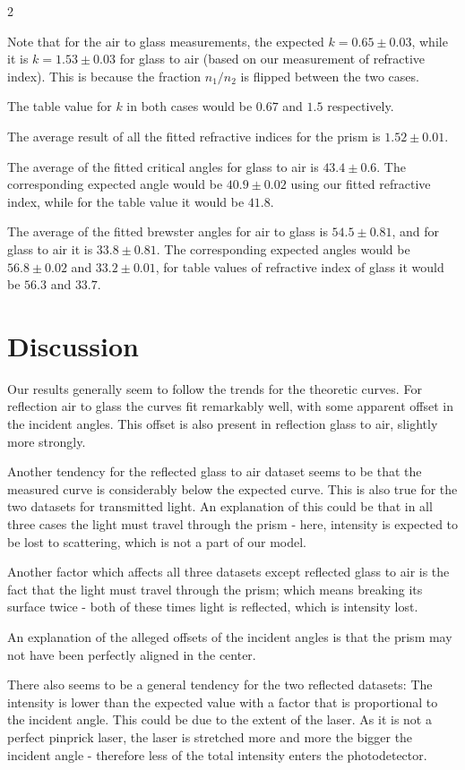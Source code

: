\documentclass[a4paper,oneside,article]{memoir}
\begin{document}
\begin{multicols}{2}

Note that for the air to glass measurements, the expected $k=0.65\pm 0.03$, while it is $k=1.53\pm0.03$ for glass to air (based on our measurement of refractive index). This is because the fraction $n_1/n_2$ is flipped between the two cases.

The table value for $k$ in both cases would be $0.67$ and $1.5$ respectively.

The average result of all the fitted refractive indices for the prism is $1.52\pm0.01$. 

The average of the fitted critical angles for glass to air is $43.4\pm0.6$. The corresponding expected angle would be $40.9\pm0.02$ using our fitted refractive index, while for the table value it would be $41.8$.

The average of the fitted brewster angles for air to glass is $54.5\pm0.81$, and for glass to air it is $33.8\pm0.81$. The corresponding expected angles would be $56.8\pm0.02$ and $33.2\pm0.01$, for table values of refractive index of glass it would be $56.3$ and $33.7$.

\chapter{Discussion}
Our results generally seem to follow the trends for the theoretic curves. For reflection air to glass the curves fit remarkably well, with some apparent offset in the incident angles. This offset is also present in reflection glass to air, slightly more strongly. 

Another tendency for the reflected glass to air dataset seems to be that the measured curve is considerably below the expected curve. This is also true for the two datasets for transmitted light. An explanation of this could be that in all three cases the light must travel through the prism - here, intensity is expected to be lost to scattering, which is not a part of our model.

Another factor which affects all three datasets except reflected glass to air is the fact that the light must travel through the prism; which means breaking its surface twice - both of these times light is reflected, which is intensity lost.

An explanation of the alleged offsets of the incident angles is that the prism may not have been perfectly aligned in the center. 

There also seems to be a general tendency for the two reflected datasets: The intensity is lower than the expected value with a factor that is proportional to the incident angle. This could be due to the extent of the laser. As it is not a perfect pinprick laser, the laser is stretched more and more the bigger the incident angle - therefore less of the total intensity enters the photodetector.


\end{multicols}
\end{document}
